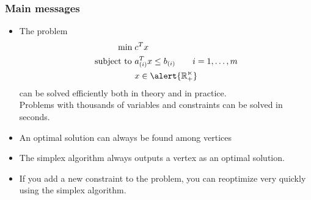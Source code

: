 \documentclass[9pt]{beamer}
\begin{document}
\begin{frame}
\frametitle{Main messages}
\begin{itemize}
\item The problem
\begin{align*}
\min\; & c^T x\\
\text{subject to } & a_{(i)}^T x \leq b_{(i)}\qquad i=1,\ldots, m\\
& x\in \alert{\mathbb{R^n_+}}
\end{align*}
can be solved efficiently both \alert{in theory} and in \alert{practice}.\\
Problems with \alert{thousands} of variables and constraints can be solved in \alert{seconds}.\medskip
\item \alert{An} optimal solution can always be found among \alert{vertices}\medskip
\item The \alert{simplex algorithm} always outputs a \alert{vertex} as an optimal solution.\medskip
\item If you \alert{add a new constraint to the problem}, you can \alert{reoptimize} very quickly using the simplex algorithm.
\end{itemize}
\end{frame}
\end{document}
